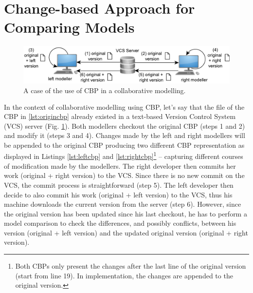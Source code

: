 \documentclass{llncs}
\begin{document}
\section{Change-based Approach for Comparing Models}
\label{sec:change_based_approach_for_comparing_models}

 \begin{figure}
    \includegraphics[width=\linewidth]{images/VCS}
    \caption{A case of the use of CBP in a collaborative modelling.}
    \label{fig:vcs}
\end{figure}

In the context of collaborative modelling using CBP, let's say that the file of the CBP in \ref{lst:origincbp} already existed in a text-based Version Control System (VCS) server (Fig. \ref{fig:vcs}). Both modellers checkout the original CBP (steps 1 and 2) and modify it (steps 3 and 4). Changes made by the left and right modellers will be appended to the original CBP producing two different CBP representation as displayed in Listings \ref{lst:leftcbp} and \ref{lst:rightcbp}\footnote{Both CBPs only present the changes after the last line of the original version (start from line 19). In implementation, the changes are appended to the original version.} -- capturing different courses of modification made by the modellers. The right developer then commits her work (original + right version) to the VCS. Since there is no new commit on the VCS, the commit process is straightforward (step 5). The left developer then decide to also commit his work (original + left version) to the VCS, thus his machine downloads the current version from the server (step 6). However, since the original version has been updated since his last checkout, he has to perform a model comparison to check the differences, and possibly conflicts, between his version (original + left version) and the updated original version (original + right version). 
\end{document}
